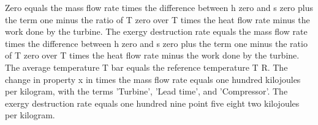 Zero equals the mass flow rate times the difference between h zero and s zero plus the term one minus the ratio of T zero over T times the heat flow rate minus the work done by the turbine. The exergy destruction rate equals the mass flow rate times the difference between h zero and s zero plus the term one minus the ratio of T zero over T times the heat flow rate minus the work done by the turbine. The average temperature T bar equals the reference temperature T R. The change in property x in times the mass flow rate equals one hundred kilojoules per kilogram, with the terms 'Turbine', 'Lead time', and 'Compressor'. The exergy destruction rate equals one hundred nine point five eight two kilojoules per kilogram.